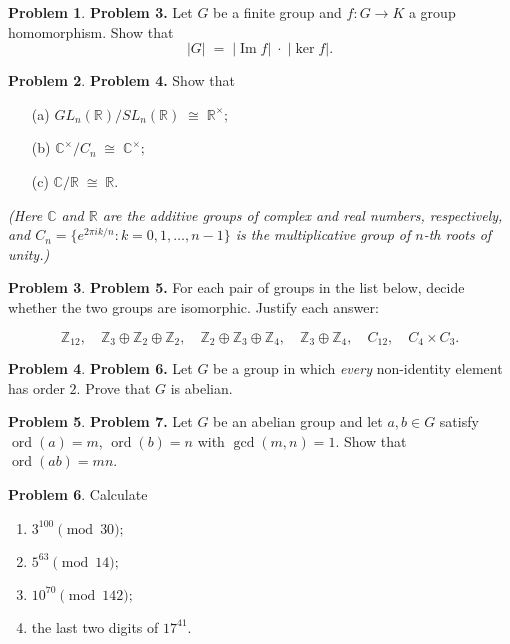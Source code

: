 \documentclass[10pt]{article}
\theoremstyle{definition} %
\newtheorem{problem}{Problem}
\theoremstyle{plain} %
\begin{document}
  \bigskip
  \begin{problem}
  \textbf{Problem 3.}
  Let \(G\) be a finite group and \(f\colon G\to K\) a group homomorphism.
  Show that
  \[
     |G|\;=\;|\operatorname{Im}f|\;\cdot\;|\ker f|.
  \]
  \end{problem}
  
  \bigskip
  \begin{problem}
  \textbf{Problem 4.} Show that
  \begin{enumerate}
    \item[(a)] \(GL_{n}(\mathbb R)/SL_{n}(\mathbb R)\;\cong\;\mathbb R^{\times};\)
    \item[(b)] \(\mathbb C^{\times}/C_{n}\;\cong\;\mathbb C^{\times};\)
    \item[(c)] \(\mathbb C/\mathbb R\;\cong\;\mathbb R.\)
  \end{enumerate}
  \emph{(Here \(\mathbb C\) and \(\mathbb R\) are the additive groups of
  complex and real numbers, respectively, and
  \(C_{n}=\{e^{2\pi ik/n}:k=0,1,\dots,n-1\}\) is the multiplicative group of
  \(n\)-th roots of unity.)}
  \end{problem}
  
  \bigskip
  \begin{problem}
  \textbf{Problem 5.}
  For each pair of groups in the list below, decide whether the two groups
  are isomorphic.  Justify each answer:
  
  \[
    \mathbb Z_{12},\quad
    \mathbb Z_{3}\oplus\mathbb Z_{2}\oplus\mathbb Z_{2},\quad
    \mathbb Z_{2}\oplus\mathbb Z_{3}\oplus\mathbb Z_{4},\quad
    \mathbb Z_{3}\oplus\mathbb Z_{4},\quad
    C_{12},\quad
    C_{4}\times C_{3}.
  \]
  \end{problem}
  
  \bigskip
  \begin{problem}
  \textbf{Problem 6.}
  Let \(G\) be a group in which \emph{every} non-identity element has order
  \(2\).  Prove that \(G\) is abelian.
  \end{problem}
  
  \bigskip
  \begin{problem}
  \textbf{Problem 7.}
  Let \(G\) be an abelian group and let \(a,b\in G\) satisfy
  \(\operatorname{ord}(a)=m\), \(\operatorname{ord}(b)=n\) with
  \(\gcd(m,n)=1\).
  Show that \(\operatorname{ord}(ab)=mn\).
  \end{problem}
  \begin{problem}
    Calculate
    \begin{enumerate}[label=(\alph*)]
        \item $3^{100} \pmod{30};$
        \item $5^{63} \pmod{14};$
        \item $10^{70} \pmod{142};$
        \item the last two digits of $17^{41}$.
    \end{enumerate}
\end{problem}
\end{document}
